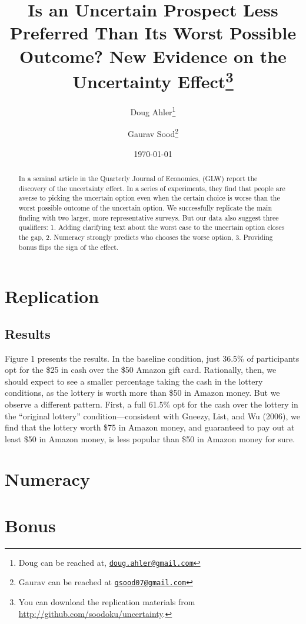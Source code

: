 \documentclass[12pt, letterpaper]{article}
\title{Is an Uncertain Prospect Less Preferred Than Its Worst Possible Outcome? New Evidence on the Uncertainty Effect\thanks{You can download the replication materials from \href{http://github.com/soodoku/uncertainty}{http://github.com/soodoku/uncertainty}.}}
\author{Doug Ahler\thanks{Doug can be reached at, \href{mailto:doug.ahler@gmail.com}{\footnotesize{\texttt{doug.ahler@gmail.com}}}} \and Gaurav Sood\thanks{Gaurav can be reached at \href{mailto:gsood07@gmail.com}{\footnotesize{\texttt{gsood07@gmail.com}}}}}
\date{\today}
\begin{document}
\maketitle

\thispagestyle{empty}
\begin{abstract}
\noindent In a seminal article in the Quarterly Journal of Economics, \cite{gneezy2006uncertainty} (GLW) report the discovery of the uncertainty effect. In a series of experiments, they find that people are averse to picking the uncertain option even when the certain choice is worse than the worst possible outcome of the uncertain option. We successfully replicate the main finding with two larger, more representative surveys. But our data also suggest three qualifiers: 1. Adding clarifying text about the worst case to the uncertain option closes the gap, 2. Numeracy strongly predicts who chooses the worse option, 3. Providing bonus flips the sign of the effect.
\end{abstract} 
\clearpage
\setcounter{page}{1}
\doublespace

\section*{Replication}
\subsection*{Results}

Figure 1 presents the results. In the baseline condition, just 36.5\% of participants opt for the \$25 in cash over the \$50 Amazon gift card. Rationally, then, we should expect to see a smaller percentage taking the cash in the lottery conditions, as the lottery is worth more than \$50 in Amazon money. But we observe a different pattern. First, a full 61.5\% opt for the cash over the lottery in the ``original lottery'' condition—consistent with Gneezy, List, and Wu (2006), we find that the lottery worth \$75 in Amazon money, and guaranteed to pay out at least \$50 in Amazon money, is less popular than \$50 in Amazon money for sure. 


\section*{Numeracy}

\section*{Bonus}
\end{document}
